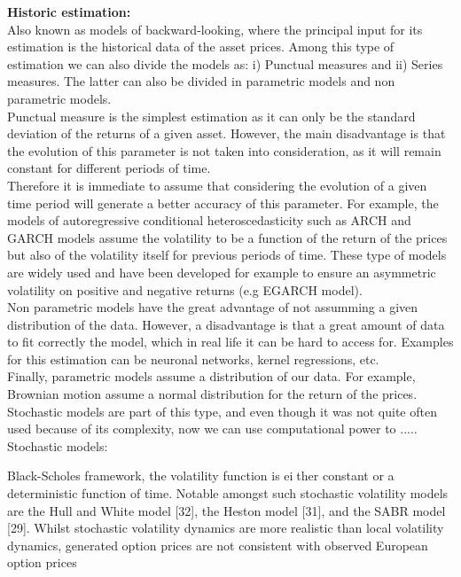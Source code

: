 \documentclass[12pt,oneside]{article}
\begin{document}
\textbf{Historic estimation:} 
\\

Also known as models of backward-looking, where the principal input for its estimation is the historical data of the asset prices. Among this type of estimation we can also divide the models as: i) Punctual measures and ii) Series measures. The latter can also be divided in parametric models and non parametric models.
 \\
 
Punctual measure is the simplest estimation as it can only be the standard deviation of the returns of a given asset. However, the main disadvantage is that the evolution of this parameter is not taken into consideration, as it will remain constant for different periods of time. 
\\

Therefore it is immediate to assume that considering the evolution of a given time period will generate a better accuracy of this parameter. For example, the models of autoregressive conditional heteroscedasticity such as ARCH and GARCH models assume the volatility to be a function of the return of the prices but also of the volatility itself for previous periods of time. These type of models are widely used and have been developed for example to ensure an asymmetric volatility on positive and negative returns (e.g EGARCH model).
\\

Non parametric models have the great advantage of not assumming a given distribution of the data. However, a disadvantage is that a great amount of data to fit correctly the model, which in real life it can be hard to access for. Examples for this estimation can be neuronal networks, kernel regressions, etc.
\\

Finally, parametric models assume a distribution of our data. For example, Brownian motion assume a normal distribution for the return of the prices. Stochastic models are part of this type, and even though it was not quite often used because of its complexity, now we can use computational power to .....
\\

Stochastic models:

Black-Scholes framework, the volatility function is either constant or a deterministic function of time.  Notable amongst such stochastic volatility models are the Hull and White model [32], the
Heston model [31], and the SABR model [29]. Whilst stochastic volatility
dynamics are more realistic than local volatility dynamics, generated option
prices are not consistent with observed European option prices
\end{document}
